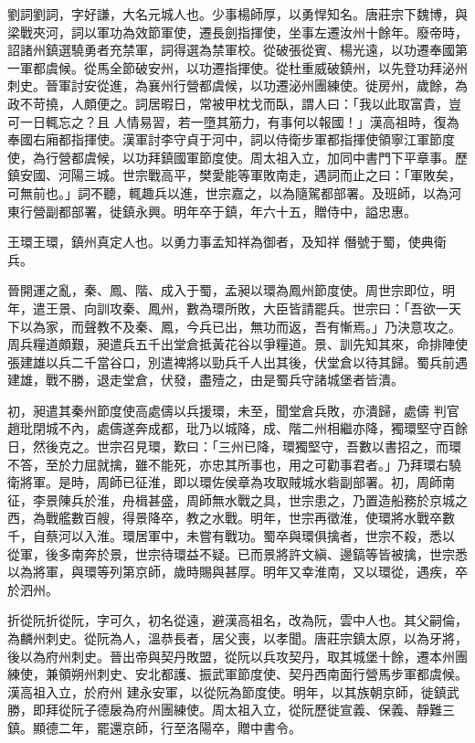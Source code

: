 \begin{pinyinscope}
 劉詞劉詞，字好謙，大名元城人也。少事楊師厚，以勇悍知名。唐莊宗下魏博，與梁戰夾河，詞以軍功為效節軍使，遷長劍指揮使，坐事左遷汝州十餘年。廢帝時，詔諸州鎮選驍勇者充禁軍，詞得選為禁軍校。從破張從賓、楊光遠，以功遷奉國第一軍都虞候。從馬全節破安州，以功遷指揮使。從杜重威破鎮州，以先登功拜泌州刺史。晉軍討安從進，為襄州行營都虞候，以功遷泌州團練使。徙房州，歲餘，為政不苛撓，人頗便之。詞居暇日，常被甲枕戈而臥，謂人曰：「我以此取富貴，豈可一日輒忘之？且
 人情易習，若一墮其筋力，有事何以報國！」漢高祖時，復為奉國右廂都指揮使。漢軍討李守貞于河中，詞以侍衛步軍都指揮使領寧江軍節度使，為行營都虞候，以功拜鎮國軍節度使。周太祖入立，加同中書門下平章事。歷鎮安國、河陽三城。世宗戰高平，樊愛能等軍敗南走，遇詞而止之曰：「軍敗矣，可無前也。」詞不聽，輒趣兵以進，世宗嘉之，以為隨駕都部署。及班師，以為河東行營副都部署，徙鎮永興。明年卒于鎮，年六十五，贈侍中，謚忠惠。



 王環王環，鎮州真定人也。以勇力事孟知祥為御者，及知祥
 僭號于蜀，使典衛兵。



 晉開運之亂，秦、鳳、階、成入于蜀，孟昶以環為鳳州節度使。周世宗即位，明年，遣王景、向訓攻秦、鳳州，數為環所敗，大臣皆請罷兵。世宗曰：「吾欲一天下以為家，而聲教不及秦、鳳，今兵已出，無功而返，吾有慚焉。」乃決意攻之。周兵糧道頗艱，昶遣兵五千出堂倉抵黃花谷以爭糧道。景、訓先知其來，命排陣使張建雄以兵二千當谷口，別遣裨將以勁兵千人出其後，伏堂倉以待其歸。蜀兵前遇建雄，戰不勝，退走堂倉，伏發，盡殪之，由是蜀兵守諸城堡者皆潰。



 初，昶遣其秦州節度使高處儔以兵援環，未至，聞堂倉兵敗，亦潰歸，處儔
 判官趙玭閉城不內，處儔遂奔成都，玭乃以城降，成、階二州相繼亦降，獨環堅守百餘日，然後克之。世宗召見環，歎曰：「三州已降，環獨堅守，吾數以書招之，而環不答，至於力屈就擒，雖不能死，亦忠其所事也，用之可勸事君者。」乃拜環右驍衛將軍。是時，周師已征淮，即以環佐侯章為攻取賊城水砦副部署。初，周師南征，李景陳兵於淮，舟楫甚盛，周師無水戰之具，世宗患之，乃置造船務於京城之西，為戰艦數百艘，得景降卒，教之水戰。明年，世宗再徵淮，使環將水戰卒數千，自蔡河以入淮。環居軍中，未嘗有戰功。蜀卒與環俱擒者，世宗不殺，悉以
 從軍，後多南奔於景，世宗待環益不疑。已而景將許文縝、邊鎬等皆被擒，世宗悉以為將軍，與環等列第京師，歲時賜與甚厚。明年又幸淮南，又以環從，遇疾，卒於泗州。



 折從阮折從阮，字可久，初名從遠，避漢高祖名，改為阮，雲中人也。其父嗣倫，為麟州刺史。從阮為人，溫恭長者，居父喪，以孝聞。唐莊宗鎮太原，以為牙將，後以為府州刺史。晉出帝與契丹敗盟，從阮以兵攻契丹，取其城堡十餘，遷本州團練使，兼領朔州刺史、安北都護、振武軍節度使、契丹西南面行營馬步軍都虞候。漢高祖入立，於府州
 建永安軍，以從阮為節度使。明年，以其族朝京師，徙鎮武勝，即拜從阮子德扆為府州團練使。周太祖入立，從阮歷徙宣義、保義、靜難三鎮。顯德二年，罷還京師，行至洛陽卒，贈中書令。



\end{pinyinscope}